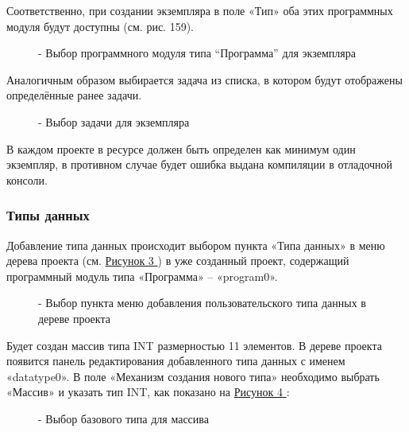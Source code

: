 \documentclass[letterpaper,10pt,russian]{sphinxmanual}
\begin{document}
Соответственно, при создании экземпляра в поле «Тип» оба этих
программных модуля будут доступны (см. рис. 159).
\begin{figure}[htbp]
\centering
\capstart

\noindent{}
\caption{- Выбор программного модуля типа ``Программа'' для экземпляра}\label{usage_guide/work_with_project:image202}\end{figure}

Аналогичным образом выбирается задача из списка, в котором будут
отображены определённые ранее задачи.
\begin{figure}[htbp]
\centering
\capstart

\noindent{}
\caption{- Выбор задачи для экземпляра}\label{usage_guide/work_with_project:image203}\end{figure}

В каждом проекте в ресурсе должен быть определен как минимум один
экземпляр, в противном случае будет ошибка выдана компиляции в
отладочной консоли.


\subsubsection{Типы данных}
\label{usage_guide/work_with_project:id13}
Добавление типа данных происходит выбором пункта «Типа данных» в меню
дерева проекта (см. \hyperref[usage_guide/work_with_project:image204]{Рисунок \ref{usage_guide/work_with_project:image204} }) в уже созданный проект, содержащий
программный модуль типа «Программа» – «program0».
\begin{figure}[htbp]
\centering
\capstart

\noindent{}
\caption{- Выбор пункта меню добавления пользовательского типа данных в дереве проекта}\label{usage_guide/work_with_project:image204}\end{figure}

Будет создан массив типа INT размерностью 11 элементов. В дереве проекта
появится панель редактирования добавленного типа данных с именем
«datatype0». В поле «Механизм создания нового типа»
необходимо выбрать «Массив» и указать тип INT, как показано на \hyperref[usage_guide/work_with_project:image205]{Рисунок \ref{usage_guide/work_with_project:image205} }:
\begin{figure}[htbp]
\centering
\capstart

\noindent{}
\caption{- Выбор базового типа для массива}\label{usage_guide/work_with_project:image205}\end{figure}
\end{document}
